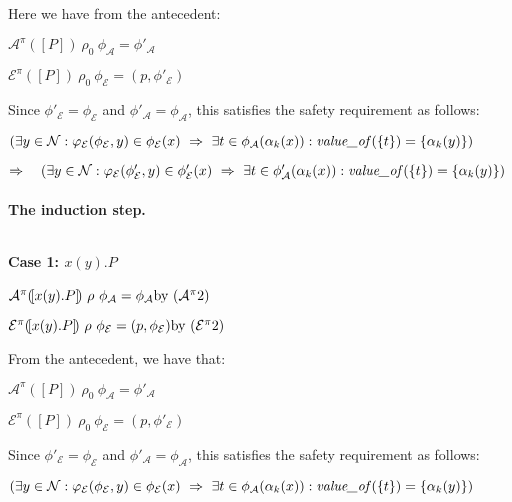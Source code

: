 \documentclass[10pt,a4paper,final,oneside,fleqn]{book}
\begin{document}
\noindent
Here we have from the antecedent:

\noindent
$\mathcal{A}^\pi(\![P]\!)~\rho_0~\phi_\mathcal{A}=\phi'_\mathcal{A}$

\noindent
$\mathcal{E}^\pi(\![P]\!)~\rho_0~\phi_\mathcal{E}=(p,\phi'_\mathcal{E})$\vspace{5mm}

\noindent
Since $\phi'_\mathcal{E}=\phi_\mathcal{E}$ and $\phi'_\mathcal{A}=\phi_\mathcal{A}$, this satisfies the safety requirement as follows:

\noindent
$(\exists y\in\mathcal{N}:\varphi_\mathcal{E}(\phi_\mathcal{E},y)\in\phi_\mathcal{E}(x)~\Rightarrow~\exists t\in\phi_\mathcal{A}(\alpha_k(x)):\mbox{{\itshape value\_of\/}}(\{t\})=\{\alpha_k(y)\})$\vspace{5mm}

\noindent
$\Rightarrow~~~(\exists y\in\mathcal{N}:\varphi_\mathcal{E}(\phi'_\mathcal{E},y)\in\phi'_\mathcal{E}(x)~\Rightarrow~\exists t\in\phi'_\mathcal{A}(\alpha_k(x)):\mbox{{\itshape value\_of\/}}(\{t\})=\{\alpha_k(y)\})$

\paragraph{The induction step.}
$ $

\noindent
{\bf Case 1: $x(y).P$}

\noindent
$\mathcal{A}^\pi(\![x(y).P]\!)~\rho~\phi_\mathcal{A}=\phi_\mathcal{A}\hfill\mbox{by }(\mathcal{A}^{\pi}2)$\

\noindent
$\mathcal{E}^\pi(\![x(y).P]\!)~\rho~\phi_\mathcal{E}=(p,\phi_\mathcal{E})\hfill\mbox{by }(\mathcal{E}^{\pi}2)$\vspace{5mm}

\noindent
From the antecedent, we have that:

\noindent
$\mathcal{A}^\pi(\![P]\!)~\rho_0~\phi_\mathcal{A}=\phi'_\mathcal{A}$

\noindent
$\mathcal{E}^\pi(\![P]\!)~\rho_0~\phi_\mathcal{E}=(p,\phi'_\mathcal{E})$\vspace{5mm}

\noindent
Since $\phi'_\mathcal{E}=\phi_\mathcal{E}$ and $\phi'_\mathcal{A}=\phi_\mathcal{A}$, this satisfies the safety requirement as follows:

\noindent
$(\exists y\in\mathcal{N}:\varphi_\mathcal{E}(\phi_\mathcal{E},y)\in\phi_\mathcal{E}(x)~\Rightarrow~\exists t\in\phi_\mathcal{A}(\alpha_k(x)):\mbox{{\itshape value\_of\/}}(\{t\})=\{\alpha_k(y)\})$\vspace{5mm}
\end{document}
